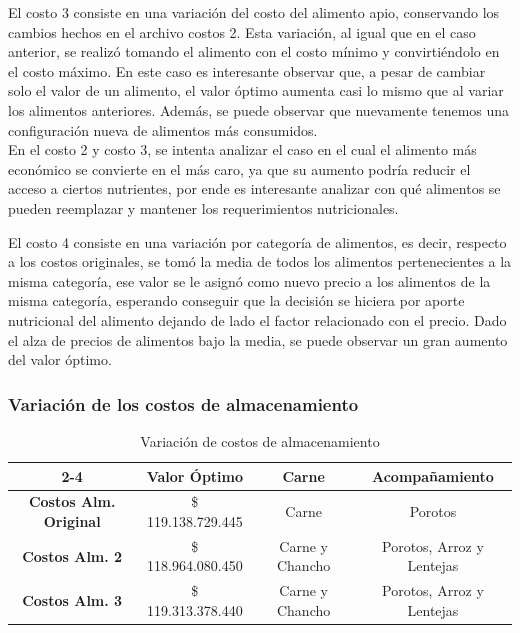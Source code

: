 \documentclass[letterpaper]{article}
\begin{document}
El costo 3 consiste en una variación del costo del alimento apio, conservando los cambios hechos en el archivo costos 2. Esta variación, al igual que en el caso anterior, se realizó tomando el alimento con el costo mínimo y convirtiéndolo en el costo máximo. En este caso es interesante observar que, a pesar de cambiar solo el valor de un alimento, el valor óptimo aumenta casi lo mismo que al variar los alimentos anteriores. Además, se puede observar que nuevamente tenemos una configuración nueva de alimentos más consumidos.\\

En el costo 2 y costo 3, se intenta analizar el caso en el cual el alimento más económico se convierte en el más caro, ya que su aumento podría reducir el acceso a ciertos nutrientes, por ende es interesante analizar con qué alimentos se pueden reemplazar y mantener los requerimientos nutricionales.

El costo 4 consiste en una variación por categoría de alimentos, es decir, respecto a los costos originales, se tomó la media de todos los alimentos pertenecientes a la misma categoría, ese valor se le asignó como nuevo precio a los alimentos de la misma categoría, esperando conseguir que la decisión se hiciera por aporte nutricional del alimento dejando de lado el factor relacionado con el precio. Dado el alza de precios de alimentos bajo la media, se puede observar un gran aumento del valor óptimo.\\

\subsubsection{Variación de los costos de almacenamiento}

\begin{table}[H]
\centering
\begin{tabular}{c|c|c|c|}
\cline{2-4}
 & \textbf{Valor Óptimo} & \textbf{Carne} & \textbf{Acompañamiento} \\ \hline
\multicolumn{1}{|c|}{\textbf{Costos Alm. Original}} & \$ 119.138.729.445 & Carne & Porotos \\ \hline
\multicolumn{1}{|c|}{\textbf{Costos Alm. 2}} & \$ 118.964.080.450 & Carne y Chancho & Porotos, Arroz y Lentejas \\ \hline
\multicolumn{1}{|c|}{\textbf{Costos Alm. 3}} & \$ 119.313.378.440 & Carne y Chancho & Porotos, Arroz y Lentejas \\ \hline
\end{tabular}
\caption{Variación de costos de almacenamiento}
\end{table}
\end{document}

